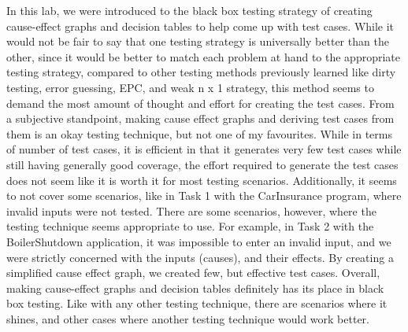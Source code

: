 In this lab, we were introduced to the black box testing strategy of creating
cause-effect graphs and decision tables to help come up with test cases. 
While it would not be fair to say that one testing strategy
is universally better than the other, since it would be better to match
each problem at hand to the appropriate testing strategy, compared to other
testing methods previously learned like dirty testing, error guessing, EPC, and
weak n x 1 strategy, this method seems to demand the most amount of thought and
effort for creating the test cases. 
From a subjective standpoint, making cause effect graphs and deriving test
cases from them is an okay testing technique, but not one of my favourites.
While in terms of number of test cases, it is efficient in that it generates
very few test cases while still having generally good coverage, the effort
required to generate the test cases does not seem like it is worth it for most
testing scenarios. Additionally, it seems to not cover some scenarios, like in
Task 1 with the CarInsurance program, where invalid inputs were not tested.
There are some scenarios, however, where the testing technique seems
appropriate to use. For example, in Task 2 with the BoilerShutdown application,
it was impossible to enter an invalid input, and we were strictly concerned
with the inputs (causes), and their effects. By creating a simplified
cause effect graph, we created few, but effective test cases. Overall, making
cause-effect graphs and decision tables definitely has its place in black box
testing. Like with any other testing technique, there are scenarios where it
shines, and other cases where another testing technique would work better.


